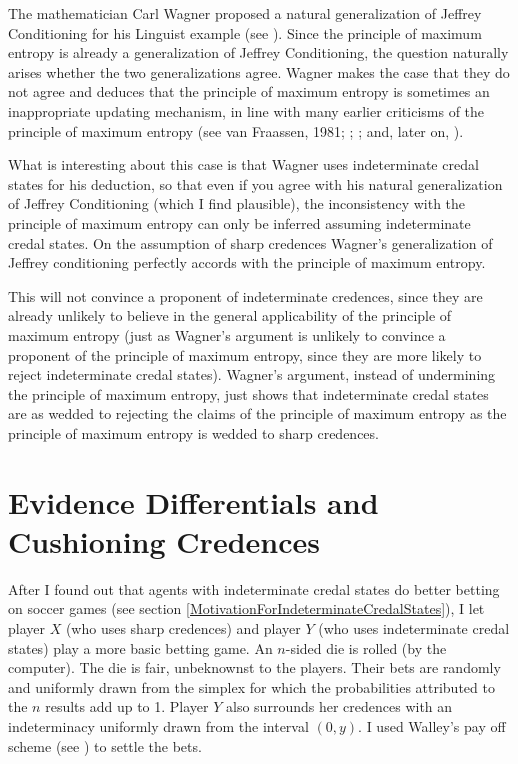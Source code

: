 \documentclass[11pt]{article}
\begin{document}
The mathematician Carl Wagner proposed a natural generalization of
Jeffrey Conditioning for his Linguist example (see
). Since the principle of maximum entropy is
already a generalization of Jeffrey Conditioning, the question
naturally arises whether the two generalizations agree. Wagner makes
the case that they do not agree and deduces that the principle of
maximum entropy is sometimes an inappropriate updating mechanism, in
line with many earlier criticisms of the principle of maximum entropy
(see van Fraassen, 1981; ;
; and, later on,
). 

What is interesting about this case is that Wagner uses indeterminate
credal states for his deduction, so that even if you agree with his
natural generalization of Jeffrey Conditioning (which I find
plausible), the inconsistency with the principle of maximum entropy
can only be inferred assuming indeterminate credal states. On the
assumption of sharp credences Wagner's generalization of Jeffrey
conditioning perfectly accords with the principle of maximum entropy.

This will not convince a proponent of indeterminate credences, since
they are already unlikely to believe in the general applicability of
the principle of maximum entropy (just as Wagner's argument is
unlikely to convince a proponent of the principle of maximum entropy,
since they are more likely to reject indeterminate credal states).
Wagner's argument, instead of undermining the principle of maximum
entropy, just shows that indeterminate credal states are as wedded to
rejecting the claims of the principle of maximum entropy as the
principle of maximum entropy is wedded to sharp credences.

\section{Evidence Differentials and Cushioning Credences} 
\label{WalleysWorldCupWoes}

After I found out that agents with indeterminate credal states do
better betting on soccer games (see section
\ref{MotivationForIndeterminateCredalStates}), I let player $X$ (who
uses sharp credences) and player $Y$ (who uses indeterminate credal
states) play a more basic betting game. An $n$-sided die is rolled (by
the computer). The die is fair, unbeknownst to the players. Their bets
are randomly and uniformly drawn from the simplex for which the
probabilities attributed to the $n$ results add up to 1. Player $Y$
also surrounds her credences with an indeterminacy uniformly drawn
from the interval $(0,y)$. I used Walley's pay off scheme (see
) to settle the bets.
\end{document}
